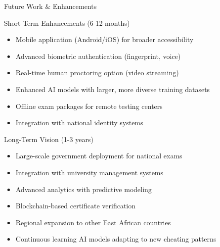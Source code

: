 \begin{frame}{Future Work \& Enhancements}
    \begin{block}{Short-Term Enhancements (6-12 months)}
        \begin{itemize}
            \item Mobile application (Android/iOS) for broader accessibility
            \item Advanced biometric authentication (fingerprint, voice)
            \item Real-time human proctoring option (video streaming)
            \item Enhanced AI models with larger, more diverse training datasets
            \item Offline exam packages for remote testing centers
            \item Integration with national identity systems
        \end{itemize}
    \end{block}
    
    \begin{block}{Long-Term Vision (1-3 years)}
        \begin{itemize}
            \item Large-scale government deployment for national exams
            \item Integration with university management systems
            \item Advanced analytics with predictive modeling
            \item Blockchain-based certificate verification
            \item Regional expansion to other East African countries
            \item Continuous learning AI models adapting to new cheating patterns
        \end{itemize}
    \end{block}
\end{frame}

